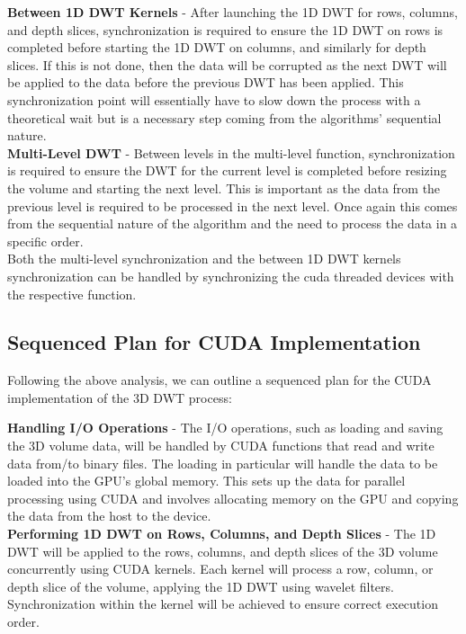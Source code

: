 \documentclass{article}
\begin{document}
\textbf{Between 1D DWT Kernels} - After launching the 1D DWT for rows, columns, and depth slices, synchronization is required to ensure the 1D DWT on rows is completed before starting the 1D DWT on columns, and similarly for depth slices. If this is not done, then the data will be corrupted as the next DWT will be applied to the data before the previous DWT has been applied. This synchronization point will essentially have to slow down the process with a theoretical wait but is a necessary step coming from the algorithms' sequential nature.\\

\textbf{Multi-Level DWT} - Between levels in the multi-level function, synchronization is required to ensure the DWT for the current level is completed before resizing the volume and starting the next level. This is important as the data from the previous level is required to be processed in the next level. Once again this comes from the sequential nature of the algorithm and the need to process the data in a specific order.\\

Both the multi-level synchronization and the between 1D DWT kernels synchronization can be handled by synchronizing the cuda threaded devices with the respective function.\\ 

\subsection{Sequenced Plan for CUDA Implementation}
Following the above analysis, we can outline a sequenced plan for the CUDA implementation of the 3D DWT process:

\textbf{Handling I/O Operations} - The I/O operations, such as loading and saving the 3D volume data, will be handled by CUDA functions that read and write data from/to binary files. The loading in particular will handle the data to be loaded into the GPU's global memory. This sets up the data for parallel processing using CUDA and involves allocating memory on the GPU and copying the data from the host to the device.\\

\textbf{Performing 1D DWT on Rows, Columns, and Depth Slices} - The 1D DWT will be applied to the rows, columns, and depth slices of the 3D volume concurrently using CUDA kernels. Each kernel will process a row, column, or depth slice of the volume, applying the 1D DWT using wavelet filters. Synchronization within the kernel will be achieved to ensure correct execution order.\\
   
\end{document}
